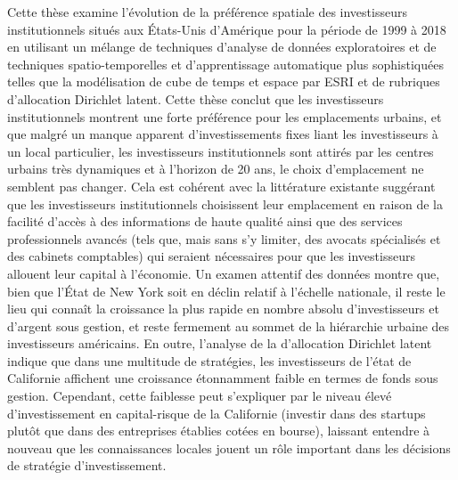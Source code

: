 \documentclass[12pt,letterpaper]{book}
\numberwithin{figure}{chapter}
\newenvironment{preliminary}%
{\pagestyle{plain}\pagenumbering{roman}}%
{\pagenumbering{arabic}}
\begin{document}
\begin{preliminary}
\begin{spacing}{2}
			Cette th\`{e}se examine l'\'{e}volution de la pr\'{e}f\'{e}rence spatiale des investisseurs institutionnels situ\'{e}s aux \'{E}tats-Unis d'Am\'{e}rique pour la p\'{e}riode de 1999 \`{a} 2018 en utilisant un m\'{e}lange de techniques d'analyse de donn\'{e}es exploratoires et de techniques spatio-temporelles et d'apprentissage automatique plus sophistiqu\'{e}es telles que la mod\'{e}lisation de cube de temps et espace par ESRI et de rubriques d'allocation Dirichlet latent. Cette th\`{e}se conclut que les investisseurs institutionnels montrent une forte pr\'{e}f\'{e}rence pour les emplacements urbains, et que malgr\'{e} un manque apparent d'investissements fixes liant les investisseurs \`{a} un local particulier, les investisseurs institutionnels sont attir\'{e}s par les centres urbains tr\`{e}s dynamiques et \`{a} l'horizon de 20 ans, le choix d'emplacement ne semblent pas changer. Cela est coh\'{e}rent avec la litt\'{e}rature existante sugg\'{e}rant que les investisseurs institutionnels choisissent leur emplacement en raison de la facilit\'{e} d'acc\`{e}s \`{a} des informations de haute qualit\'{e} ainsi que des services professionnels avanc\'{e}s (tels que, mais sans s'y limiter, des avocats sp\'{e}cialis\'{e}s et des cabinets comptables) qui seraient n\'{e}cessaires pour que les investisseurs allouent leur capital \`{a} l’\'{e}conomie. Un examen attentif des donn\'{e}es montre que, bien que l'\'{E}tat de New York soit en d\'{e}clin relatif \`{a} l'\'{e}chelle nationale, il reste le lieu qui connaît la croissance la plus rapide en nombre absolu d'investisseurs et d'argent sous gestion, et reste fermement au sommet de la hi\'{e}rarchie urbaine des investisseurs am\'{e}ricains. En outre, l'analyse de la d'allocation Dirichlet latent indique que dans une multitude de strat\'{e}gies, les investisseurs de l'\'{e}tat de Californie affichent une croissance \'{e}tonnamment faible en termes de fonds sous gestion. Cependant, cette faiblesse peut s'expliquer par le niveau \'{e}lev\'{e} d'investissement en capital-risque de la Californie (investir dans des startups plutôt que dans des entreprises \'{e}tablies cot\'{e}es en bourse), laissant entendre \`{a} nouveau que les connaissances locales jouent un r\^{o}le important dans les d\'{e}cisions de strat\'{e}gie d'investissement.
			
			
		\end{spacing}
		
		\newpage		
		
		\begin{spacing}{1.5}
			

\end{spacing}
\end{preliminary}
\end{document}
